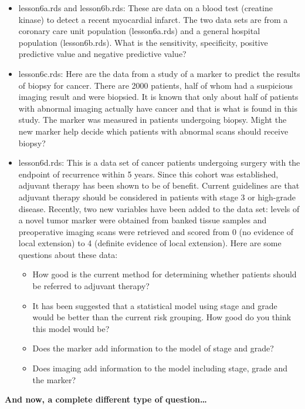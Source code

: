 \documentclass[]{book}
\providecommand{\tightlist}{%
  \setlength{\itemsep}{0pt}\setlength{\parskip}{0pt}}
\begin{document}
\begin{itemize}
\item
  lesson6a.rds and lesson6b.rds: These are data on a blood test (creatine kinase) to detect a recent myocardial infarct. The two data sets are from a coronary care unit population (lesson6a.rds) and a general hospital population (lesson6b.rds). What is the sensitivity, specificity, positive predictive value and negative predictive value?
\item
  lesson6c.rds: Here are the data from a study of a marker to predict the results of biopsy for cancer. There are 2000 patients, half of whom had a suspicious imaging result and were biopsied. It is known that only about half of patients with abnormal imaging actually have cancer and that is what is found in this study. The marker was measured in patients undergoing biopsy. Might the new marker help decide which patients with abnormal scans should receive biopsy?
\item
  lesson6d.rds: This is a data set of cancer patients undergoing surgery with the endpoint of recurrence within 5 years. Since this cohort was established, adjuvant therapy has been shown to be of benefit. Current guidelines are that adjuvant therapy should be considered in patients with stage 3 or high-grade disease. Recently, two new variables have been added to the data set: levels of a novel tumor marker were obtained from banked tissue samples and preoperative imaging scans were retrieved and scored from 0 (no evidence of local extension) to 4 (definite evidence of local extension). Here are some questions about these data:

  \begin{itemize}
  \tightlist
  \item
    How good is the current method for determining whether patients should be referred to adjuvant therapy?
  \item
    It has been suggested that a statistical model using stage and grade would be better than the current risk grouping. How good do you think this model would be?
  \item
    Does the marker add information to the model of stage and grade?
  \item
    Does imaging add information to the model including stage, grade and the marker?
  \end{itemize}
\end{itemize}

\textbf{And now, a complete different type of question\ldots{}}
\end{document}
